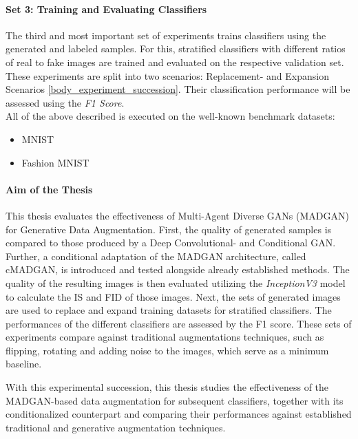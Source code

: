 \paragraph{Set 3: Training and Evaluating Classifiers}  \label{thesis_goal_3}
The third and most important set of experiments trains classifiers using the generated and labeled samples. For this, stratified classifiers with different ratios of real to fake images are trained and evaluated on the respective validation set. These experiments are split into two scenarios: Replacement- and Expansion Scenarios \ref{body_experiment_succession}. Their classification performance will be assessed using the \textit{F1 Score}.  \\

\noindent All of the above described is executed on the well-known benchmark datasets:
\begin{itemize}\label{used_datasets}
    \setlength{\itemsep}{-5pt}
    \item MNIST \cite{lecun2010mnist}
    \item Fashion MNIST \cite{xiao2017fashionmnist}
\end{itemize}


\paragraph{Aim of the Thesis}\label{aim_of_the_thesis}
This thesis evaluates the effectiveness of Multi-Agent Diverse GANs (MADGAN) for Generative Data Augmentation. First, the quality of generated samples is compared to those produced by a Deep Convolutional- and Conditional GAN. Further, a conditional adaptation of the MADGAN architecture, called cMADGAN, is introduced and tested alongside already established methods. The quality of the resulting images is then evaluated utilizing the \textit{InceptionV3} model to calculate the IS and FID of those images. Next, the sets of generated images are used to replace and expand training datasets for stratified classifiers. The performances of the different classifiers are assessed by the F1 score. These sets of experiments compare against traditional augmentations techniques, such as flipping, rotating and adding noise to the images, which serve as a minimum baseline. 

\noindent
With this experimental succession, this thesis studies the effectiveness of the MADGAN-based data augmentation for subsequent classifiers, together with its conditionalized counterpart and comparing their performances against established traditional and generative augmentation techniques. 

